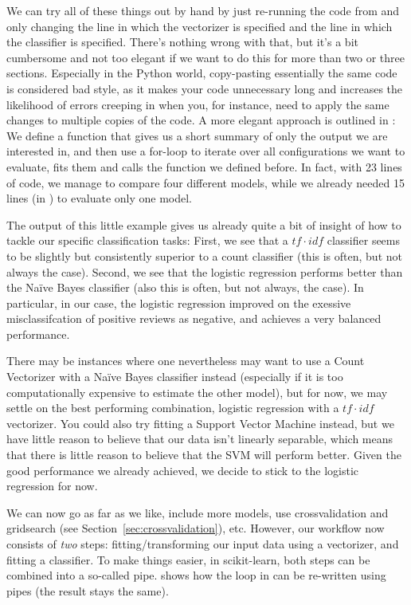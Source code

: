 We can try all of these things out by hand by just re-running the code
from  and only changing the line in which the
vectorizer is specified and the line in which the classifier is
specified. There's nothing wrong with that, but it's a bit cumbersome
and not too elegant if we want to do this for more than two or three
sections. Especially in the Python world, copy-pasting essentially the
same code is considered bad style, as it makes your code unnecessary
long and increases the likelihood of errors creeping in when you, for
instance, need to apply the same changes to multiple copies of the
code.  A more elegant approach is outlined in
: We define a function that gives us a short
summary of only the output we are interested in, and then use a
for-loop to iterate over all configurations we want to evaluate, fits
them and calls the function we defined before. In fact, with 23 lines
of code, we manage to compare four different models, while we already
needed 15 lines (in ) to evaluate only one model.



The output of this little example gives us already quite a bit of
insight of how to tackle our specific classification tasks: First, we
see that a $tf\cdot idf$ classifier seems to be slightly but
consistently superior to a count classifier (this is often, but not
always the case). Second, we see that the logistic regression performs
better than the Na\"ive Bayes classifier (also this is often, but not
always, the case). In particular, in our case, the logistic regression
improved on the exessive misclassifcation of positive reviews as
negative, and achieves a very balanced performance.

There may be instances where one nevertheless may want to use a Count
Vectorizer with a Na\"ive Bayes classifier instead (especially if it
is too computationally expensive to estimate the other model), but for
now, we may settle on the best performing combination, logistic
regression with a $tf\cdot idf$ vectorizer. You could also try fitting
a Support Vector Machine instead, but we have little reason to believe
that our data isn't linearly separable, which means that there is
little reason to believe that the SVM will perform better. Given the
good performance we already achieved, we decide to stick to the
logistic regression for now.


We can now go as far as we like, include more models, use
crossvalidation and gridsearch (see
Section~\ref{sec:crossvalidation}), etc. However, our workflow now
consists of \emph{two} steps: fitting/transforming our input data
using a vectorizer, and fitting a classifier. To make things easier,
in scikit-learn, both steps can be combined into a so-called
pipe.  shows how the loop in
 can be re-written using pipes (the
result stays the same).

